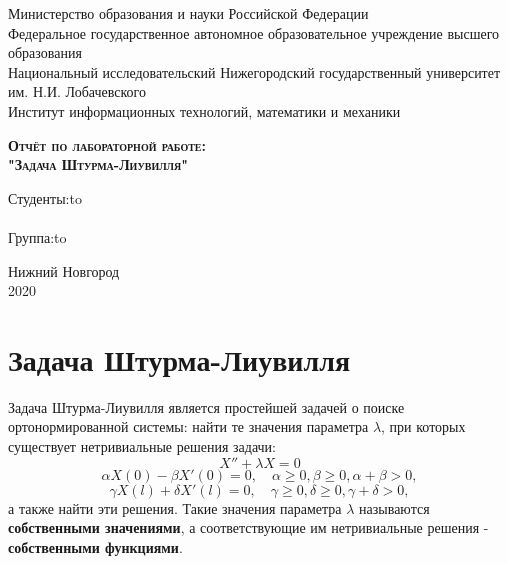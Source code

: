 \documentclass[12pt, a4paper]{article}
\begin{document}
\begin{titlepage}
\newpage

\begin{center}
Министерство образования и науки Российской Федерации \\
Федеральное государственное автономное образовательное
учреждение высшего образования \\
Национальный исследовательский Нижегородский государственный
университет им. Н.И. Лобачевского \\
Институт информационных технологий, математики и механики \\
\end{center}

\vspace{12em}

\begin{center}
\textsc{\textbf{Отчёт по лабораторной работе:}}\\
\textsc{\textbf{"Задача Штурма-Лиувилля"}}
\end{center}

\vspace{14em}



\newbox{\lbox}
\newlength{\maxl}
\setlength{\maxl}{\wd\lbox}
\hfill\parbox{11cm}{
\hspace*{5cm}\hspace*{-5cm}Студенты:\hfill\hbox to\\
\\
\hspace*{5cm}\hspace*{-5cm}Группа:\hfill\hbox to\\
}


\vspace{\fill}

\begin{center}
Нижний Новгород \\2020
\end{center}

\end{titlepage}       


\section{Задача Штурма-Лиувилля}

Задача Штурма-Лиувилля является простейшей задачей о поиске ортонормированной системы: найти те значения параметра $\lambda$, при которых существует нетривиальные решения задачи:
\[ X'' + \lambda X = 0 \]
\[ \alpha X(0) - \beta X'(0) = 0, \quad \alpha \geq 0, \beta \geq 0, \alpha + \beta > 0, \]
\[ \gamma X(l) + \delta X'(l) = 0, \quad \gamma \geq 0, \delta \geq 0, \gamma + \delta > 0, \]
а также найти эти решения. Такие значения параметра $\lambda$ называются \textbf{собственными значениями}, а соответствующие им нетривиальные решения - \textbf{собственными функциями}.
\end{document}
